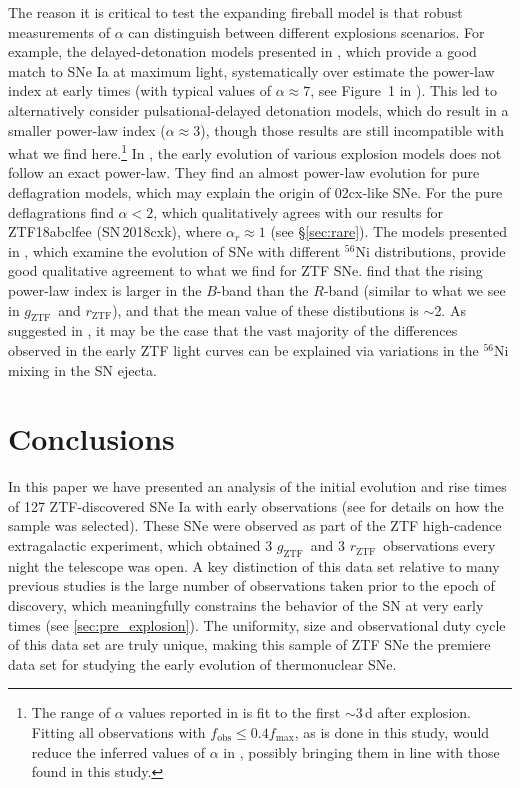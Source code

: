 \documentclass[twocolumn]{./aastex63}
\newcommand{\rztf}{$r_\mathrm{ZTF}$}
\newcommand{\gztf}{$g_\mathrm{ZTF}$}
\begin{document}
The reason it is critical to test the expanding fireball model is that robust
measurements of $\alpha$ can distinguish between different explosions
scenarios. For example, the delayed-detonation models presented in
\citet{Blondin13}, which provide a good match to SNe Ia at maximum light,
systematically over estimate the power-law index at early times (with typical
values of $\alpha \approx 7$, see Figure~1 in \citealt{Dessart14}). This led
\citet{Dessart14} to alternatively consider pulsational-delayed detonation
models, which do result in a smaller power-law index ($\alpha \approx 3$),
though those results are still incompatible with what we find
here.\footnote{The range of $\alpha$ values reported in \citet{Dessart14} is
fit to the first $\sim$3\,d after explosion. Fitting all observations with
$f_\mathrm{obs} \leq 0.4 f_\mathrm{max}$, as is done in this study, would
reduce the inferred values of $\alpha$ in \citet{Dessart14}, possibly bringing
them in line with those found in this study.} In \citet{Noebauer17}, the early
evolution of various explosion models does not follow an exact power-law. They
find an almost power-law evolution for pure deflagration models, which may
explain the origin of 02cx-like SNe. For the pure deflagrations
\citet{Noebauer17} find $\alpha < 2$, which qualitatively agrees with our
results for ZTF18abclfee (SN\,2018cxk), where $\alpha_r \approx 1$ (see
\S\ref{sec:rare}). The models presented in \citet{Magee19}, which examine the
evolution of SNe with different $^{56}$Ni distributions, provide good
qualitative agreement to what we find for ZTF SNe. \citet{Magee19} find that
the rising power-law index is larger in the $B$-band than the $R$-band
(similar to what we see in \gztf\ and \rztf), and that the mean value of these
distibutions is $\sim$2. As suggested in \citet{Magee19}, it may be the case
that the vast majority of the differences observed in the early ZTF light
curves can be explained via variations in the $^{56}$Ni mixing in the SN
ejecta.


\section{Conclusions}

In this paper we have presented an analysis of the initial evolution and rise
times of 127 ZTF-discovered SNe Ia with early observations (see
\citealt{Yao19} for details on how the sample was selected). These SNe were
observed as part of the ZTF high-cadence extragalactic experiment, which
obtained 3 \gztf\ and 3 \rztf\ observations every night the telescope was
open. A key distinction of this data set relative to many previous studies is
the large number of observations taken prior to the epoch of discovery, which
meaningfully constrains the behavior of the SN at very early times (see
\ref{sec:pre_explosion}). The uniformity, size and observational duty cycle of
this data set are truly unique, making this sample of ZTF SNe the premiere
data set for studying the early evolution of thermonuclear SNe.
\end{document}
